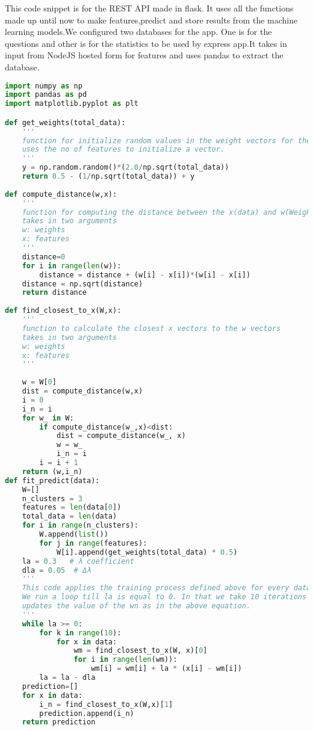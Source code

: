 \documentclass[a4paper,12pt,oneside]{book}
\begin{document}
This code snippet is for the REST API made in flask. It uses all the functions made up until now to make features,predict and store results from the machine learning models.We configured two databases for the app. One is for the questions and other is for the statistics to be used by express app.It takes in input from NodeJS hosted form for features and uses pandas to extract the database.\\
\begin{lstlisting}[language = Python, caption = Self Oganizing Map's Functions]
import numpy as np
import pandas as pd
import matplotlib.pyplot as plt

def get_weights(total_data):
    '''
    function for initialize random values in the weight vectors for the neural network to be used.
    uses the no of features to initialize a vector.
    '''
    y = np.random.random()*(2.0/np.sqrt(total_data))
    return 0.5 - (1/np.sqrt(total_data)) + y 
    
def compute_distance(w,x):
    '''
    function for computing the distance between the x(data) and w(Weight) vector
    takes in two arguments 
    w: weights
    x: features
    '''
    distance=0
    for i in range(len(w)):
        distance = distance + (w[i] - x[i])*(w[i] - x[i])
    distance = np.sqrt(distance)
    return distance
    
def find_closest_to_x(W,x):
    '''
    function to calculate the closest x vectors to the w vectors
    takes in two arguments
    w: weights
    x: features
    '''
    
    w = W[0]
    dist = compute_distance(w,x)
    i = 0
    i_n = i
    for w_ in W:
        if compute_distance(w_,x)<dist:
            dist = compute_distance(w_, x)
            w = w_
            i_n = i
        i = i + 1
    return (w,i_n)
def fit_predict(data):
    W=[]
    n_clusters = 3
    features = len(data[0])
    total_data = len(data)
    for i in range(n_clusters):
        W.append(list())
        for j in range(features):
            W[i].append(get_weights(total_data) * 0.5)
    la = 0.3   # λ coefficient
    dla = 0.05  # Δλ
    '''
    This code applies the training process defined above for every data point given in the dataset.
    We run a loop till la is equal to 0. In that we take 10 iterations and find closest datapoint ot the neuron and then
    updates the value of the wn as in the above equation.
    '''
    while la >= 0:
        for k in range(10):
            for x in data:
                wm = find_closest_to_x(W, x)[0]
                for i in range(len(wm)):
                    wm[i] = wm[i] + la * (x[i] - wm[i]) 
        la = la - dla
    prediction=[]
    for x in data:
        i_n = find_closest_to_x(W,x)[1]
        prediction.append(i_n)
    return prediction
\end{lstlisting}
\end{document}
